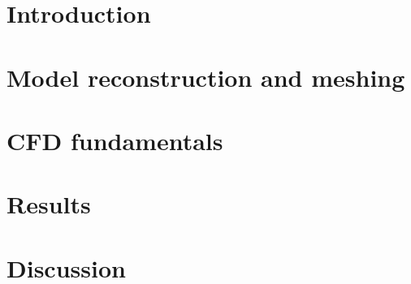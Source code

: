 \documentclass[12pt]{report}
\begin{document}
\chapter{Introduction}



%
%

\chapter{Model reconstruction and meshing} \label{MRM}



\chapter{CFD fundamentals} \label{cfd}



\chapter{Results}



\chapter{Discussion}



% 
% 
 

 

  
\end{document}
